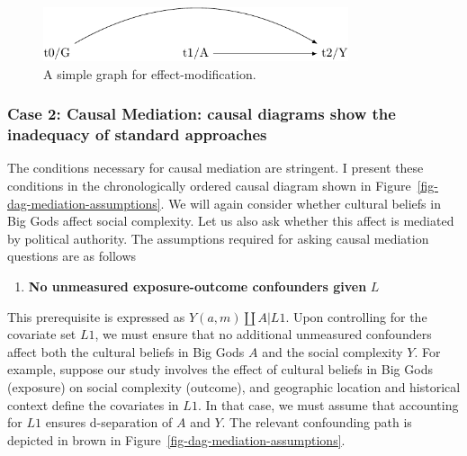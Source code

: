 \documentclass[
  singlecolumn]{article}
\providecommand{\tightlist}{%
  \setlength{\itemsep}{0pt}\setlength{\parskip}{0pt}}\usepackage{longtable,booktabs,array}
\begin{document}
\begin{figure}

{\centering \includegraphics[width=0.8\textwidth,height=\textheight]{causal-dags_files/figure-pdf/fig-dag-effect-modfication-1.pdf}

}

\caption{\label{fig-dag-effect-modfication}A simple graph for
effect-modification.}

\end{figure}

\hypertarget{case-2-causal-mediation-causal-diagrams-show-the-inadequacy-of-standard-approaches}{%
\subsubsection{Case 2: Causal Mediation: causal diagrams show the
inadequacy of standard
approaches}\label{case-2-causal-mediation-causal-diagrams-show-the-inadequacy-of-standard-approaches}}

The conditions necessary for causal mediation are stringent. I present
these conditions in the chronologically ordered causal diagram shown in
Figure~\ref{fig-dag-mediation-assumptions}. We will again consider
whether cultural beliefs in Big Gods affect social complexity. Let us
also ask whether this affect is mediated by political authority. The
assumptions required for asking causal mediation questions are as
follows

\begin{enumerate}
\def\labelenumi{\arabic{enumi}.}
\tightlist
\item
  \textbf{No unmeasured exposure-outcome confounders given} \(L\)
\end{enumerate}

This prerequisite is expressed as \(Y(a,m) \coprod A | L1\). Upon
controlling for the covariate set \(L1\), we must ensure that no
additional unmeasured confounders affect both the cultural beliefs in
Big Gods \(A\) and the social complexity \(Y\). For example, suppose our
study involves the effect of cultural beliefs in Big Gods (exposure) on
social complexity (outcome), and geographic location and historical
context define the covariates in \(L1\). In that case, we must assume
that accounting for \(L1\) ensures d-separation of \(A\) and \(Y\). The
relevant confounding path is depicted in brown in
Figure~\ref{fig-dag-mediation-assumptions}.
\end{document}
